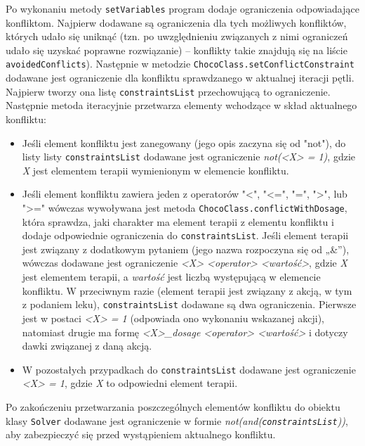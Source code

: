 Po wykonaniu metody \texttt{setVariables} program dodaje ograniczenia odpowiadające konfliktom. 
Najpierw dodawane są ograniczenia dla tych możliwych konfliktów, których udało się uniknąć (tzn. po uwzględnieniu związanych z nimi ograniczeń udało się uzyskać poprawne rozwiązanie) -- konflikty takie znajdują się na liście \texttt{avoidedConflicts}). Następnie w metodzie \texttt{ChocoClass.setConflictConstraint} dodawane jest ograniczenie dla konfliktu sprawdzanego w aktualnej iteracji pętli. Najpierw tworzy ona listę \texttt{constraintsList} przechowującą to ograniczenie. Następnie metoda iteracyjnie przetwarza elementy wchodzące w skład aktualnego konfliktu:
\begin{itemize}
\item Jeśli element konfliktu jest zanegowany (jego opis zaczyna się od "not"), do listy listy \texttt{constraintsList} dodawane jest ograniczenie \textit{not(<X> = 1)}, gdzie \textit{X} jest elementem terapii wymienionym w elemencie konfliktu. 
\item Jeśli element konfliktu zawiera jeden z operatorów "<", "<=", "=", ">", lub ">=" wówczas wywoływana jest metoda \texttt{ChocoClass.conflictWithDosage}, która sprawdza, jaki charakter ma element terapii z elementu konfliktu i dodaje odpowiednie ograniczenia do \texttt{constraintsList}. Jeśli element terapii jest związany z dodatkowym pytaniem (jego nazwa rozpoczyna się od „\&”), wówczas dodawane jest ograniczenie \textit{<X> <operator> <wartość>}, gdzie \textit{X} jest elementem terapii, a \textit{wartość} jest liczbą występującą w elemencie konfliktu. W przeciwnym razie (element terapii jest związany z akcją, w tym z podaniem leku), \texttt{constraintsList} dodawane są dwa ograniczenia. Pierwsze jest w postaci \textit{<X> = 1} (odpowiada ono wykonaniu wskazanej akcji), natomiast drugie ma formę \textit{<X>\_dosage <operator> <wartość>} i dotyczy dawki związanej z daną akcją. 
\item W pozostałych przypadkach do \texttt{constraintsList} dodawane jest ograniczenie \textit{<X> = 1}, gdzie \textit{X} to odpowiedni element terapii.
\end{itemize}

Po zakończeniu przetwarzania poszczególnych elementów konfliktu do obiektu klasy \texttt{Solver} dodawane jest ograniczenie w formie \textit{not(and(\texttt{constraintsList}))}, aby zabezpieczyć się przed wystąpieniem aktualnego konfliktu.

